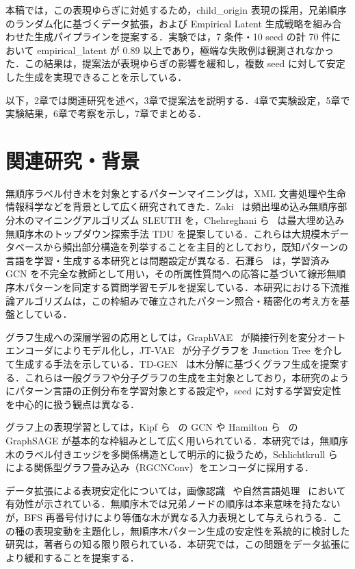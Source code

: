 \documentclass[submit,techrep,noauthor]{ipsj}
\begin{document}
本稿では，この表現ゆらぎに対処するため，child\_origin 表現の採用，兄弟順序のランダム化に基づくデータ拡張，および Empirical Latent 生成戦略を組み合わせた生成パイプラインを提案する．実験では，7 条件・10 seed の計 70 件において empirical\_latent が 0.89 以上であり，極端な失敗例は観測されなかった．この結果は，提案法が表現ゆらぎの影響を緩和し，複数 seed に対して安定した生成を実現できることを示している．

以下，2章では関連研究を述べ，3章で提案法を説明する．4章で実験設定，5章で実験結果，6章で考察を示し，7章でまとめる．

\section{関連研究・背景}

無順序ラベル付き木を対象とするパターンマイニングは，XML 文書処理や生命情報科学などを背景として広く研究されてきた．Zaki~\cite{zaki2005} は頻出埋め込み無順序部分木のマイニングアルゴリズム SLEUTH を，Chehreghani ら~\cite{chehreghani2007} は最大埋め込み無順序木のトップダウン探索手法 TDU を提案している．これらは大規模木データベースから頻出部分構造を列挙することを主目的としており，既知パターンの言語を学習・生成する本研究とは問題設定が異なる．石灘ら~\cite{ishinada2026} は，学習済み GCN を不完全な教師として用い，その所属性質問への応答に基づいて線形無順序木パターンを同定する質問学習モデルを提案している．本研究における下流推論アルゴリズムは，この枠組みで確立されたパターン照合・精密化の考え方を基盤としている．

グラフ生成への深層学習の応用としては，GraphVAE~\cite{simonovsky2018} が隣接行列を変分オートエンコーダによりモデル化し，JT-VAE~\cite{jin2018} が分子グラフを Junction Tree を介して生成する手法を示している．TD-GEN~\cite{shirzad2022} は木分解に基づくグラフ生成を提案する．これらは一般グラフや分子グラフの生成を主対象としており，本研究のようにパターン言語の正例分布を学習対象とする設定や，seed に対する学習安定性を中心的に扱う観点は異なる．

グラフ上の表現学習としては，Kipf ら~\cite{kipf2017} の GCN や Hamilton ら~\cite{hamilton2017} の GraphSAGE が基本的な枠組みとして広く用いられている．本研究では，無順序木のラベル付きエッジを多関係構造として明示的に扱うため，Schlichtkrull ら~\cite{schlichtkrull2018} による関係型グラフ畳み込み（RGCNConv）をエンコーダに採用する．

データ拡張による表現安定化については，画像認識~\cite{shorten2019} や自然言語処理~\cite{wei2019} において有効性が示されている．無順序木では兄弟ノードの順序は本来意味を持たないが，BFS 再番号付けにより等価な木が異なる入力表現として与えられうる．この種の表現変動を主題化し，無順序木パターン生成の安定性を系統的に検討した研究は，著者らの知る限り限られている．本研究では，この問題をデータ拡張により緩和することを提案する．
\end{document}
